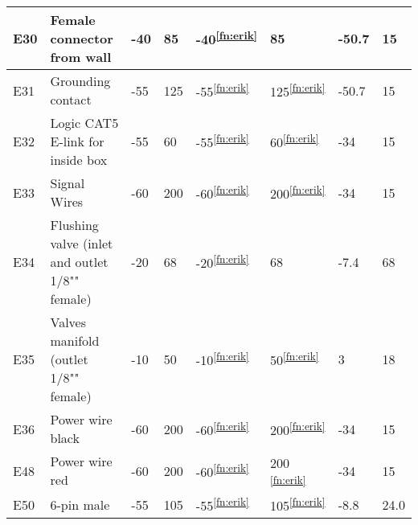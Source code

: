 \begin{longtable}{|m{1cm}|m{3.5cm}|m{1.3cm}|m{1.3cm}|m{1.4cm}|m{1.3cm}|m{1.3cm}|m{1.3cm}|}
E30 & Female connector from wall & -40 & 85 & -40\textsuperscript{\ref{fn:erik}} & 85 & -50.7 & 15 \\ \hline
E31 & Grounding contact & -55 & 125 & -55\textsuperscript{\ref{fn:erik}} & 125\textsuperscript{\ref{fn:erik}} & -50.7 & 15 \\ \hline
E32 & Logic CAT5 E-link for inside box &-55 & 60 & -55\textsuperscript{\ref{fn:erik}} & 60\textsuperscript{\ref{fn:erik}} & -34 & 15 \\ \hline
E33 & Signal Wires & -60 & 200 & -60\textsuperscript{\ref{fn:erik}} & 200\textsuperscript{\ref{fn:erik}} & -34 & 15 \\ \hline
E34 & Flushing valve (inlet and outlet 1/8"" female) & -20 & 68 & -20\textsuperscript{\ref{fn:erik}} & 68 & -7.4 & 68 \\ \hline
E35 & Valves manifold (outlet 1/8"" female) & -10 & 50 & -10\textsuperscript{\ref{fn:erik}} & 50\textsuperscript{\ref{fn:erik}} & 3 & 18 \\ \hline
E36 & Power wire black & -60 & 200 & -60\textsuperscript{\ref{fn:erik}} & 200\textsuperscript{\ref{fn:erik}} & -34 & 15 \\ \hline
E48 & Power wire red & -60 & 200 & -60\textsuperscript{\ref{fn:erik}} & 200
\textsuperscript{\ref{fn:erik}} & -34 & 15  \\ \hline
E50 & 6-pin male & -55 & 105 & -55\textsuperscript{\ref{fn:erik}} & 105\textsuperscript{\ref{fn:erik}} & -8.8 & 24.0  \\ \hline

\end{longtable}
